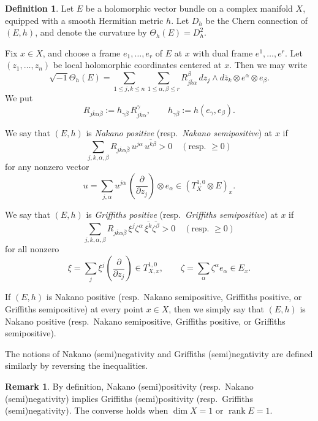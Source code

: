\documentclass[12pt,twoside]{amsart}
\DeclareMathOperator{\rank}{rank}
\theoremstyle{definition}
\newtheorem{defn}[thm]{Definition}
\newtheorem{rem}[thm]{Remark}
\begin{document}
\begin{defn}\label{x-def6.3}
Let $E$ be a holomorphic vector bundle on a complex manifold $X$, equipped with
a smooth Hermitian metric $h$.
Let $D_h$ be the Chern connection of $(E,h)$, and denote the curvature by
$\Theta_h(E)=D^2_h$.

Fix $x\in X$, and choose a frame $e_1,\dots,e_r$ of $E$ at $x$ with dual frame
$e^1,\dots,e^r$.
Let $(z_1,\dots,z_n)$ be local holomorphic coordinates centered at $x$.
Then we may write
\[
\sqrt{-1}\Theta_h(E)
 = \sum_{1 \le j,k \le n}\sum_{1 \le \alpha,\beta \le r}
   R^\beta_{j\overline{k}\alpha}\,
   dz_j \wedge d\overline{z}_k \otimes e^\alpha \otimes e_\beta.
\]
We put
\[
R_{j\overline{k}\alpha\overline{\beta}}
 := h_{\gamma\overline{\beta}}\, R^\gamma_{j\overline{k}\alpha},
 \qquad h_{\gamma\overline{\beta}} := h(e_\gamma,e_\beta).
\]

We say that $(E,h)$ is \emph{Nakano positive} (resp.\ \emph{Nakano semipositive})
at $x$ if
\[
\sum_{j,k,\alpha,\beta}
  R_{j\overline{k}\alpha\overline{\beta}}\, 
  u^{j\alpha}\,\overline{u^{k\beta}}
>0 \quad (\text{resp.\ $\ge 0$})
\]
for any nonzero vector
\[
u = \sum_{j,\alpha} u^{j\alpha}\,
     \left(\frac{\partial}{\partial z_j}\right)\otimes e_\alpha
   \in (T^{1,0}_X \otimes E)_x.
\]

We say that $(E,h)$ is \emph{Griffiths positive} (resp.\ \emph{Griffiths
semipositive}) at $x$ if
\[
\sum_{j,k,\alpha,\beta}
  R_{j\overline{k}\alpha\overline{\beta}}\,
  \xi^j\zeta^\alpha\,\overline{\xi^k}\overline{\zeta^\beta}
>0 \quad (\text{resp.\ $\ge 0$})
\]
for all nonzero
\[
\xi=\sum_j \xi^j \left(\frac{\partial}{\partial z_j}\right)
   \in T^{1,0}_{X,x},
\qquad
\zeta=\sum_\alpha \zeta^\alpha e_\alpha \in E_x.
\]

If $(E, h)$ is Nakano positive (resp.\ Nakano semipositive,
Griffiths positive, or Griffiths semipositive) at every point $x \in X$,
then we simply say that $(E, h)$ is Nakano positive (resp.\ Nakano semipositive,
Griffiths positive, or Griffiths semipositive). 

The notions of Nakano (semi)negativity and Griffiths (semi)negativity are
defined similarly by reversing the inequalities.
\end{defn}

\begin{rem}\label{x-rem6.4}
By definition, Nakano (semi)positivity (resp.\ Nakano (semi)negativity)
implies Griffiths (semi)positivity (resp.\ Griffiths (semi)negativity).
The converse holds when $\dim X=1$ or $\rank E=1$.
\end{rem}
\end{document}
